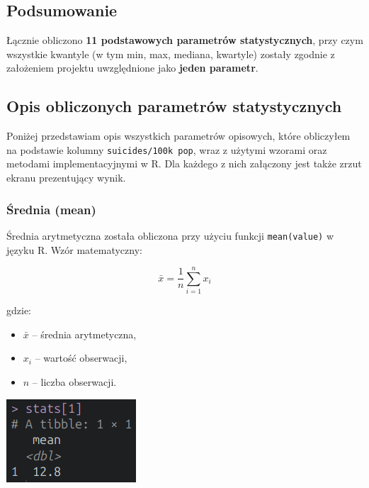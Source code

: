 \documentclass[polish]{article}
\begin{document}
    \subsection*{Podsumowanie}

    Łącznie obliczono \textbf{11 podstawowych parametrów statystycznych}, przy czym wszystkie kwantyle (w tym min, max, mediana, kwartyle) zostały zgodnie z założeniem projektu uwzględnione jako \textbf{jeden parametr}.

    \newpage

    \subsection{Opis obliczonych parametrów statystycznych}

    Poniżej przedstawiam opis wszystkich parametrów opisowych, które obliczyłem na podstawie kolumny \texttt{suicides/100k pop}, wraz z użytymi wzorami oraz metodami implementacyjnymi w R. Dla każdego z nich załączony jest także zrzut ekranu prezentujący wynik.

    \subsubsection{Średnia (mean)}

    Średnia arytmetyczna została obliczona przy użyciu funkcji \texttt{mean(value)} w języku R. Wzór matematyczny:

    \LARGE
    \[
    \bar{x} = \frac{1}{n} \sum_{i=1}^{n} x_i
    \]
    \normalsize

    \noindent gdzie:
    \begin{itemize}
    \item \( \bar{x} \) -- średnia arytmetyczna,
    \item \( x_i \) -- wartość obserwacji,
    \item \( n \) -- liczba obserwacji.
    \end{itemize}

    \begin{center}
        \includegraphics{img/mean.png}
    \end{center}
\end{document}
